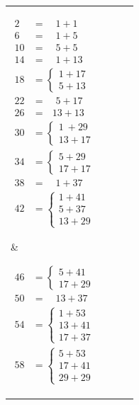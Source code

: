 \documentclass[12pt]{article}
\begin{document}
\begin{tabular}{l|l|l|l} 
\parbox[t]{0.2\linewidth}{%
    \vspace*{-\baselineskip}
    \begin{align*} 
        2 &= \quad \! 1 + 1 \\ 
        6 &= \quad \! 1 + 5 \\
        10 &= \quad \! 5 + 5 \\
        14 &= \quad \! 1 + 13 \\
        18 &= \begin{cases}
           1 + 17 \\ 5 + 13
        \end{cases} \\
        22 &= \quad \! 5 + 17 \\
        26 &= \ \ \ \! 13 + 13 \\
        30 &= \begin{cases}
           1 \ + 29 \\ 13 + 17
        \end{cases} \\
        34 &= \begin{cases}
           5 + 29 \\ 17 + 17
        \end{cases} \\
        38 &= \quad \! 1 + 37 \\
        42 &= \begin{cases}
           1 + 41 \\ 5 + 37 \\ 13 + 29
        \end{cases} 
    \end{align*}} &  
\parbox[t]{0.2\linewidth}{%
    \vspace*{-\baselineskip}
    \begin{align*} 
        46 &= \begin{cases}
           5 + 41 \\ 17 + 29
        \end{cases} \\
        50 &= \quad \! 13 + 37 \\
        54 &= \begin{cases}
           1 + 53 \\ 13 + 41 \\ 17 + 37
        \end{cases} \\
        58 &= \begin{cases}
           5 + 53 \\ 17 + 41 \\ 29 + 29

\end{cases}
\end{align*}}
\end{tabular}
\end{document}
